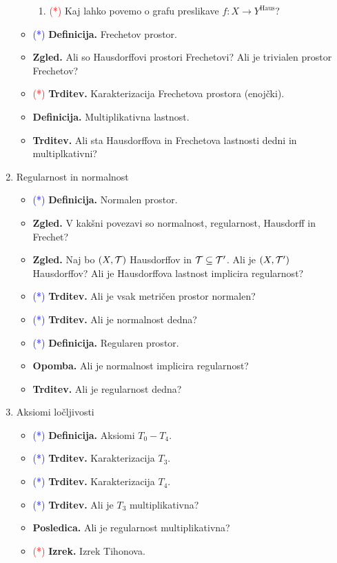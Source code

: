 \begin{enumerate}
\begin{itemize}
\begin{enumerate}
            \item \textcolor{red}{(*)} Kaj lahko povemo o grafu preslikave $f: X \to Y^\text{Haus}$?
        \end{enumerate}
        \item \textcolor{blue}{(*)} \textbf{Definicija.} Frechetov prostor.
        \item \textbf{Zgled.} Ali so Hausdorffovi prostori Frechetovi? Ali je trivialen prostor Frechetov?
        \item \textcolor{red}{(*)} \textbf{Trditev.} Karakterizacija Frechetova prostora (enojčki).
        \item \textbf{Definicija.} Multiplikativna lastnost.
        \item \textbf{Trditev.} Ali sta Hausdorffova in Frechetova lastnosti dedni in multiplkativni?        
    \end{itemize}

    \item Regularnost in normalnost
    \begin{itemize}
        \item \textcolor{blue}{(*)} \textbf{Definicija.} Normalen prostor.
        \item \textbf{Zgled.} V kakšni povezavi so normalnost, regularnost, Hausdorff in Frechet?
        \item \textbf{Zgled.} Naj bo $(X, \mathcal{T})$ Hausdorffov in $\mathcal{T} \subseteq \mathcal{T}'$. Ali je $(X, \mathcal{T}')$ Hausdorffov? Ali je Hausdorffova lastnost implicira regularnost?
        \item \textcolor{blue}{(*)} \textbf{Trditev.} Ali je vsak metričen prostor normalen?
        \item \textcolor{blue}{(*)} \textbf{Trditev.} Ali je normalnost dedna?
        \item \textcolor{blue}{(*)} \textbf{Definicija.} Regularen prostor.
        \item \textbf{Opomba.} Ali je normalnost implicira regularnost?
        \item \textbf{Trditev.} Ali je regularnost dedna?
    \end{itemize}

    \item Aksiomi ločljivosti
    \begin{itemize}
        \item \textcolor{blue}{(*)} \textbf{Definicija.} Aksiomi $T_0 - T_4$.
        \item \textcolor{blue}{(*)} \textbf{Trditev.} Karakterizacija $T_3$.
        \item \textcolor{blue}{(*)} \textbf{Trditev.} Karakterizacija $T_4$.
        \item \textcolor{blue}{(*)} \textbf{Trditev.} Ali je $T_3$ multiplikativna?
        \item \textbf{Posledica.} Ali je regularnost multiplikativna?
        \item \textcolor{red}{(*)} \textbf{Izrek.} Izrek Tihonova.
    \end{itemize}
\end{enumerate}


